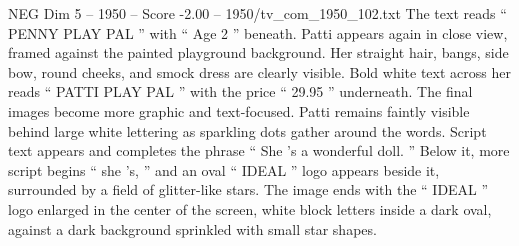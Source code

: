 \begin{textsample}{NEG Dim 5 – 1950 – Score -2.00 – 1950/tv\_com\_1950\_102.txt}
The text reads “ PENNY PLAY PAL ” with “ Age 2 ” beneath.
Patti appears again in close view, framed against the painted playground background.
Her straight hair, bangs, side bow, round cheeks, and smock dress are clearly visible.
Bold white text across her reads “ PATTI PLAY PAL ” with the price “ 29.95 ” underneath.
The final images become more graphic and text-focused.
Patti remains faintly visible behind large white lettering as sparkling dots gather around the words.
Script text appears and completes the phrase “ She ’s a wonderful doll. ” Below it, more script begins “ she ’s, ” and an oval “ IDEAL ” logo appears beside it, surrounded by a field of glitter-like stars.
The image ends with the “ IDEAL ” logo enlarged in the center of the screen, white block letters inside a dark oval, against a dark background sprinkled with small star shapes.

\end{textsample}
